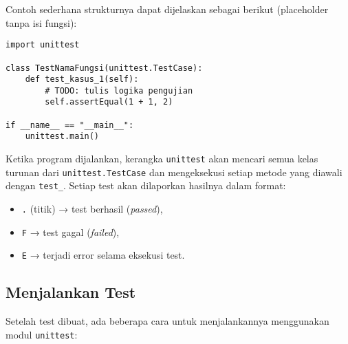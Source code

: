 Contoh sederhana strukturnya dapat dijelaskan sebagai berikut (placeholder tanpa isi fungsi):

\begin{lstlisting}[style=PythonStyle, caption={Struktur dasar kelas unit test di Python}, label={lst:unittest-structure}]
import unittest

class TestNamaFungsi(unittest.TestCase):
    def test_kasus_1(self):
        # TODO: tulis logika pengujian
        self.assertEqual(1 + 1, 2)

if __name__ == "__main__":
    unittest.main()
\end{lstlisting}

Ketika program dijalankan, kerangka \texttt{unittest} akan mencari semua kelas turunan dari \texttt{unittest.TestCase} dan mengeksekusi setiap metode yang diawali dengan \texttt{test\_}.  
Setiap test akan dilaporkan hasilnya dalam format:
\begin{itemize}
    \item \texttt{.} (titik) → test berhasil (\textit{passed}),
    \item \texttt{F} → test gagal (\textit{failed}),
    \item \texttt{E} → terjadi error selama eksekusi test.
\end{itemize}

\subsection{Menjalankan Test}

Setelah test dibuat, ada beberapa cara untuk menjalankannya menggunakan modul \texttt{unittest}:

